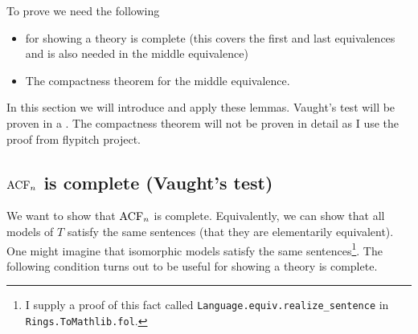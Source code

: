 

To prove  we need the following
\begin{itemize}
  \item {} for showing a theory is complete
        (this covers the first and last equivalences and
        is also needed in the middle equivalence)
  \item The compactness theorem for the middle equivalence.
\end{itemize}
In this section we will introduce and apply these lemmas.
Vaught's test will be proven in a .
The compactness theorem will not be proven
in detail as I use the proof from flypitch project.

\subsection{$\operatorname{ACF}_{n}$ is complete (Vaught's test)}
We want to show that $\operatorname{ACF}_{n}$ is complete.
Equivalently, we can show that all models of $T$ satisfy the same sentences
(that they are elementarily equivalent).
One might imagine that isomorphic models satisfy the same sentences\footnote{
  I supply a proof of this fact called
  \texttt{Language.equiv.realize\_sentence} in \texttt{Rings.ToMathlib.fol}.
}.
The following condition turns out to be useful for showing a theory is complete.

